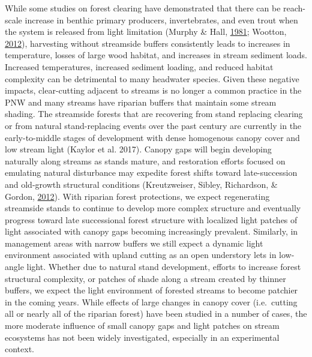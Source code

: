 \documentclass[double,12pt]{beavtex}
\begin{document}
  While some studies on forest clearing have demonstrated that there can
  be reach-scale increase in benthic primary producers, invertebrates, and
  even trout when the system is released from light limitation (Murphy \&
  Hall, \protect\hyperlink{ref-Murphy1981}{1981}; Wootton,
  \protect\hyperlink{ref-Wootton2012}{2012}), harvesting without
  streamside buffers consistently leads to increases in temperature,
  losses of large wood habitat, and increases in stream sediment loads.
  Increased temperatures, increased sediment loading, and reduced habitat
  complexity can be detrimental to many headwater species. Given these
  negative impacts, clear-cutting adjacent to streams is no longer a
  common practice in the PNW and many streams have riparian buffers that
  maintain some stream shading. The streamside forests that are recovering
  from stand replacing clearing or from natural stand-replacing events
  over the past century are currently in the early-to-middle stages of
  development with dense homogenous canopy cover and low stream light
  (Kaylor et al. 2017). Canopy gaps will begin developing naturally along
  streams as stands mature, and restoration efforts focused on emulating
  natural disturbance may expedite forest shifts toward late-succession
  and old-growth structural conditions (Kreutzweiser, Sibley, Richardson,
  \& Gordon, \protect\hyperlink{ref-Kreutzweiser2012}{2012}). With
  riparian forest protections, we expect regenerating streamside stands to
  continue to develop more complex structure and eventually progress
  toward late successional forest structure with localized light patches
  of light associated with canopy gaps becoming increasingly prevalent.
  Similarly, in management areas with narrow buffers we still expect a
  dynamic light environment associated with upland cutting as an open
  understory lets in low-angle light. Whether due to natural stand
  development, efforts to increase forest structural complexity, or
  patches of shade along a stream created by thinner buffers, we expect
  the light environment of forested streams to become patchier in the
  coming years. While effects of large changes in canopy cover
  (i.e.~cutting all or nearly all of the riparian forest) have been
  studied in a number of cases, the more moderate influence of small
  canopy gaps and light patches on stream ecosystems has not been widely
  investigated, especially in an experimental context.
  
\end{document}

